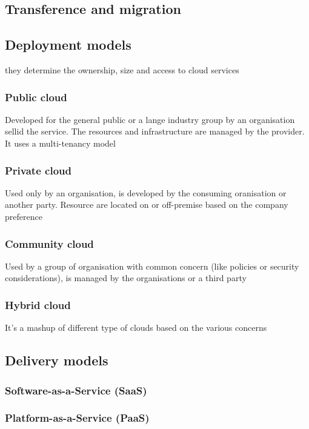\documentclass[12pt, a4paper]{article}
\begin{document}

\subsection{Transference and migration}


\subsection{Deployment models}
they determine the ownership, size and access to cloud services

\subsubsection{Public cloud}
Developed for the general public or a lange industry group by an organisation sellid the service. The resources 
and infrastructure are managed by the provider. It uses a multi-tenancy model

\subsubsection{Private cloud}
Used only by an organisation, is developed by the consuming oranisation or another party. Resource are located 
on or off-premise based on the company preference

\subsubsection{Community cloud}
Used by a group of organisation with common concern (like policies or security considerations), is managed by the
organisations or a third party

\subsubsection{Hybrid cloud}
It's a mashup of different type of clouds based on the various concerns

\subsection{Delivery models}

\subsubsection{Software-as-a-Service (SaaS)}
\subsubsection{ Platform-as-a-Service (PaaS)}
\end{document}
